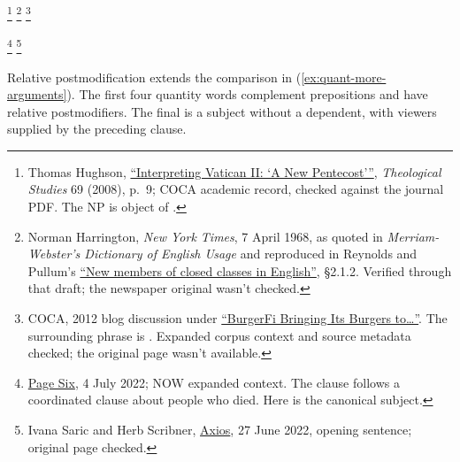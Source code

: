 \documentclass[12pt]{article}
\begin{document}
\ea\label{ex:quant-arguments}
\ea\label{ex:countless-part} \footnote{Thomas Hughson, \href{https://theologicalstudies.net/wp-content/uploads/2022/08/69.1.1.pdf\#page=7}{\enquote{Interpreting Vatican II: ‘A New Pentecost’}}, \textit{Theological Studies} 69 (2008), p.~9; COCA academic record, checked against the journal PDF. The NP is object of .}
\ex\label{ex:numerous-part} \footnote{Norman Harrington, \textit{New York Times}, 7 April 1968, as quoted in \textit{Merriam-Webster's Dictionary of English Usage} and reproduced in Reynolds and Pullum's \href{https://www.lel.ed.ac.uk/~gpullum/ClosedClasses.pdf}{\enquote{New members of closed classes in English}}, §2.1.2. Verified through that draft; the newspaper original wasn't checked.}
\ex\label{ex:multiple-part} \footnote{COCA, 2012 blog discussion under \href{http://www.tonetoatl.com/2012/08/burgerfi-bringing-its-burgers-to.html}{\enquote{BurgerFi Bringing Its Burgers to\ldots}}. The surrounding phrase is . Expanded corpus context and source metadata checked; the original page wasn't available.}
\begin{samepage}
\ex\label{ex:numerous-subj} \footnote{\href{https://pagesix.com/2022/07/04/travis-scott-performs-in-miami-at-e11even/}{Page Six}, 4 July 2022; NOW expanded context. The clause follows a coordinated clause about people who died. Here  is the canonical subject.}
\ex\label{ex:multiple-subj} \footnote{Ivana Saric and Herb Scribner, \href{https://www.axios.com/2022/06/27/amtrak-train-derail-missouri}{Axios}, 27 June 2022, opening sentence; original page checked.}
\end{samepage}
\z\z

Relative postmodification extends the comparison in (\ref{ex:quant-more-arguments}). The first four quantity words complement prepositions and have relative postmodifiers. The final  is a subject without a dependent, with viewers supplied by the preceding clause.
\end{document}
